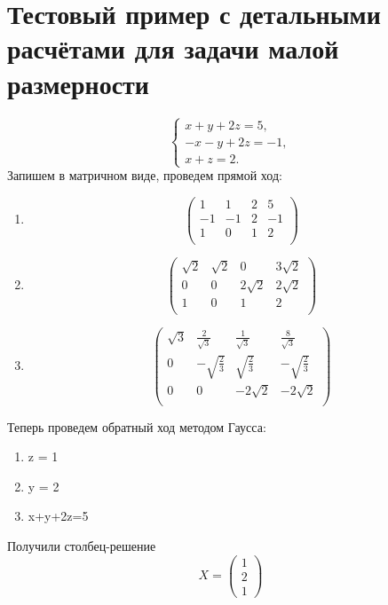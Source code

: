\documentclass{article}
\begin{document}
	\section{Тестовый пример с детальными расчётами для задачи малой размерности}
	\begin{equation*}
		\begin{cases}
			x + y + 2z = 5, 
			\\
			-x -y +2z = -1,
			\\
			x + z = 2.
		\end{cases}
	\end{equation*}
	Запишем в матричном виде, проведем прямой ход:
	\begin{enumerate}
\item	\[							
	\left(
	\begin{array}{ccc|c}
		1 & 1 & 2  & 5 \\
		-1 & -1 & 2  & -1 \\
		1 & 0 & 1  & 2 \\
	\end{array}
	\right)
	\] 
	
\item	\[							
	\left(
	\begin{array}{ccc|c}
		\sqrt{2} & \sqrt{2} & 0  & 3\sqrt{2} \\
		0 & 0 & 2\sqrt{2}  & 2\sqrt{2} \\
		1 & 0 & 1  & 2 \\
	\end{array}
	\right)
	\] 
	
\item	\[							
	\left(
	\begin{array}{ccc|c}
		\sqrt{3} & \frac{2}{\sqrt{3}} & \frac{1}{\sqrt{3}}  & \frac{8}{\sqrt{3}} \\
		0 & -\sqrt{\frac{2}{3}} & \sqrt{\frac{2}{3}}  & -\sqrt{\frac{2}{3}} \\
		0 & 0 & -2\sqrt{2}  & -2\sqrt{2} \\
	\end{array}
	\right)
	\] 
\end{enumerate}	
	
Теперь проведем обратный ход методом Гаусса:	
	\begin{enumerate}
		\item z = 1
		\item y = 2
		\item x+y+2z=5 
	\end{enumerate}
	Получили столбец-решение \[
	X = 
	\begin{pmatrix}
		1\\
		2\\
		1
	\end{pmatrix}
	\]
\end{document}
